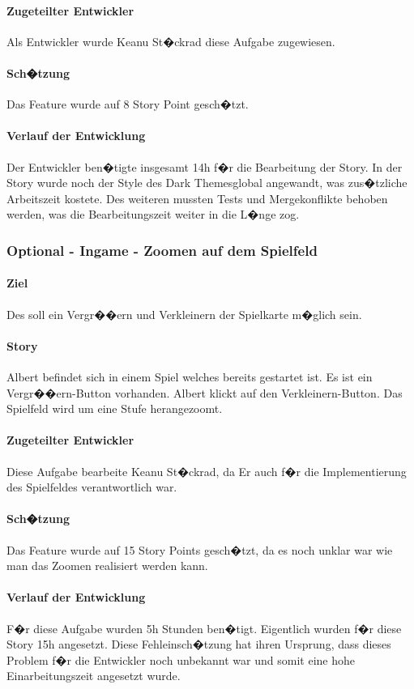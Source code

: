 \documentclass[12pt, titlepage]{scrartcl}
\begin{document}
			\paragraph{Zugeteilter Entwickler} Als Entwickler wurde Keanu St�ckrad diese Aufgabe zugewiesen.
			\paragraph{Sch�tzung}
			Das Feature wurde auf 8 Story Point gesch�tzt.
			\paragraph{Verlauf der Entwicklung} 
			Der Entwickler ben�tigte insgesamt 14h f�r die Bearbeitung der Story. In der Story wurde noch der Style des \glqq Dark Themes\grqq global angewandt, was zus�tzliche Arbeitszeit kostete. Des weiteren mussten Tests und Mergekonflikte behoben werden, was die Bearbeitungszeit weiter in die L�nge zog.
			 
			\subsubsection{Optional - Ingame - Zoomen auf dem Spielfeld}
			\paragraph{Ziel} Des soll ein Vergr��ern und Verkleinern der Spielkarte m�glich sein.
			\paragraph{Story}Albert befindet sich in einem Spiel welches bereits gestartet ist. Es ist ein \glqq Vergr��ern\grqq-Button vorhanden. Albert klickt auf den  \glqq Verkleinern\grqq-Button. Das Spielfeld wird um eine Stufe herangezoomt.
			\paragraph{Zugeteilter Entwickler} Diese Aufgabe bearbeite Keanu St�ckrad, da Er auch f�r die Implementierung des Spielfeldes verantwortlich war.
			\paragraph{Sch�tzung}
			Das Feature wurde auf 15 Story Points gesch�tzt, da es noch unklar war wie man das Zoomen realisiert werden kann.
			\paragraph{Verlauf der Entwicklung} 
			F�r diese Aufgabe wurden 5h Stunden ben�tigt. Eigentlich wurden f�r diese Story 15h angesetzt. Diese Fehleinsch�tzung hat ihren Ursprung, dass dieses Problem f�r die Entwickler noch unbekannt war und somit eine hohe Einarbeitungszeit angesetzt wurde.
			
\end{document}
